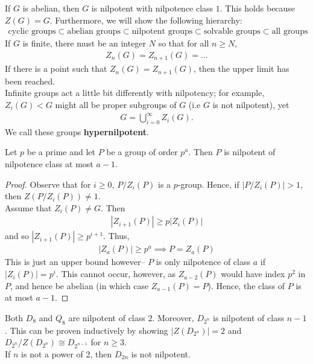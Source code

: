 \documentclass{memoir}
\begin{document}
\begin{rmrk}
	If \(G\) is abelian, then \(G\) is nilpotent with nilpotence class \(1\). This holds because \(Z(G) = G\). Furthermore, we will show the following hierarchy:
	\begin{align*}
		\text{cyclic groups}\subset \text{abelian groups}\subset \text{nilpotent groups}\subset \text{solvable groups}\subset \text{all groups}
	\end{align*}
	If \(G\) is finite, there must be an integer \(N\) so that for all \(n\geq N\),
	\begin{align*}
		Z_n(G) = Z_{n+1}(G) = \ldots
	\end{align*}
	If there is a point such that \(Z_n(G) = Z_{n+1}(G)\), then the upper limit has been reached.\\

	Infinite groups act a little bit differently with nilpotency; for example, \(Z_i(G) < G\) might all be proper subgroups of \(G\) (i.e \(G\) is not nilpotent), yet
	\begin{align*}
		G = \bigcup_{i=0} ^{\infty}Z_i(G).
	\end{align*}
	We call these groups \textbf{hypernilpotent}.
\end{rmrk}
\begin{prop}
	Let \(p\) be a prime and let \(P\) be a group of order \(p^{a}\). Then \(P\) is nilpotent of nilpotence class at most \(a-1\).
\end{prop}
\begin{proof}
	Observe that for \(i\geq 0\), \(P / Z_i(P)\) is a \(p\)-group. Hence, if \(\left| P / Z_i(P) \right| >1\), then \(Z(P / Z_i(P)) \neq 1\).\\

	Assume that \(Z_i(P) \neq G\). Then 
	\begin{align*}
	\left| Z_{i+1}(P)  \right| \geq p \left| Z_i(P) \right| 
	\end{align*}
	and so \(\left| Z_{i+1}(P) \right| \geq p^{i+1}\). Thus, 
\begin{align*}
\left| Z_a(P) \right| \geq p^{a} \implies P = Z_a(P)
\end{align*}
	This is just an upper bound however-- \(P\) is only nilpotence of class \(a\) if \(\left| Z_i(P) \right| = p^{i}\). This cannot occur, however, as \(Z_{a-2}(P)\) would have index \(p^2\) in \(P\), and hence be abelian (in which case \(Z_{a-1}(P) = P\)). Hence, the class of \(P\) is at most \(a-1\).
\end{proof}

\begin{exmp}
	Both \(D_8\) and \(Q_8\) are nilpotent of class \(2\). Moreover, \(D_{2^{n}}\) is nilpotent of class \(n-1\). This can be proven inductively by showing \(\left| Z(D_{2^{n}}) \right| =2\) and \(D_{2^{n}}/ Z(D_{2^{n}}) \cong D_{2^{n-1}}\) for \(n\geq 3\).\\

	If \(n\) is not a power of 2, then \(D_{2n}\) is not nilpotent.
\end{exmp}
\end{document}
